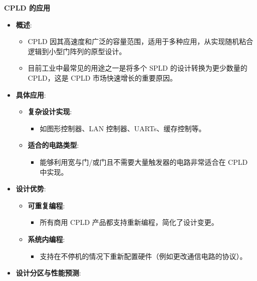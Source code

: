 \begin{frame}[allowframebreaks]{\textbf{CPLD 的应用}}
\label{cpld-ux7684ux5e94ux7528}
\begin{itemize}
\tightlist
\item
    \textbf{概述}:

    \begin{itemize}
    \tightlist
    \item
    CPLD
    因其高速度和广泛的容量范围，适用于多种应用，从实现随机粘合逻辑到小型门阵列的原型设计。
    \item
    目前工业中最常见的用途之一是将多个 SPLD 的设计转换为更少数量的
    CPLD，这是 CPLD 市场快速增长的重要原因。
    \end{itemize}
\item
    \textbf{具体应用}:

    \begin{itemize}
    \tightlist
    \item
    \textbf{复杂设计实现}:

    \begin{itemize}
    \tightlist
    \item
        如图形控制器、LAN 控制器、UARTs、缓存控制等。
    \end{itemize}
    \item
    \textbf{适合的电路类型}:

    \begin{itemize}
    \tightlist
    \item
        能够利用宽与门/或门且不需要大量触发器的电路非常适合在 CPLD
        中实现。
    \end{itemize}
    \end{itemize}
\item
    \textbf{设计优势}:

    \begin{itemize}
    \tightlist
    \item
    \textbf{可重复编程}:

    \begin{itemize}
    \tightlist
    \item
        所有商用 CPLD 产品都支持重新编程，简化了设计变更。
    \end{itemize}
    \item
    \textbf{系统内编程}:

    \begin{itemize}
    \tightlist
    \item
        支持在不停机的情况下重新配置硬件（例如更改通信电路的协议）。
    \end{itemize}
    \end{itemize}
\item
    \textbf{设计分区与性能预测}:


\end{itemize}
\end{frame}
